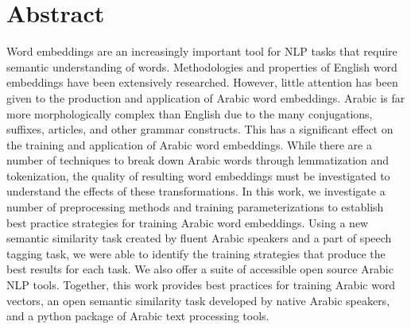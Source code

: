 \section*{Abstract}

Word embeddings are an increasingly important tool for NLP tasks that require semantic understanding of words. Methodologies and properties of English word embeddings have been extensively researched. However, little attention has been given to the production and application of Arabic word embeddings. Arabic is far more morphologically complex than English due to the many conjugations, suffixes, articles, and other grammar constructs. This has a significant effect on the training and application of Arabic word embeddings. While there are a number of techniques to break down Arabic words through lemmatization and tokenization, the quality of resulting word embeddings must be investigated to understand the effects of these transformations. In this work, we investigate a number of preprocessing methods and training parameterizations to establish best practice strategies for training Arabic word embeddings. Using a new semantic similarity task created by fluent Arabic speakers and a part of speech tagging task, we were able to identify the training strategies that produce the best results for each task. We also offer a suite of accessible open source Arabic NLP tools. Together, this work provides best practices for training Arabic word vectors, an open semantic similarity task developed by native Arabic speakers, and a python package of Arabic text processing tools.